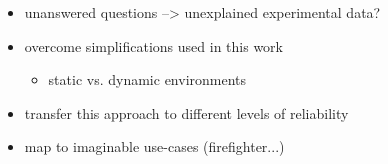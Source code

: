 \begin{itemize}
	\item{unanswered questions --> unexplained experimental data?}
	\item{overcome simplifications used in this work}
	\begin{itemize}
		\item{static vs. dynamic environments}
	\end{itemize}
	\item{transfer this approach to different levels of reliability}
	\item{map to imaginable use-cases (firefighter...)}
\end{itemize}